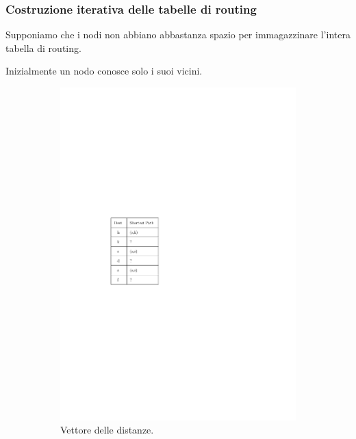 \documentclass[10pt,xcolor=dvipsnames]{beamer}
\begin{document}
\begin{frame}
	\frametitle{Costruzione iterativa delle tabelle di routing}
	Supponiamo che i nodi non abbiano abbastanza spazio per immagazzinare l'intera tabella di routing.
	\vfill
	\pause

	Inizialmente un nodo conosce solo i suoi vicini.

	\begin{figure}[h]
	\centering
		\begin{subfigure}[b]{0.35\textwidth}
			\includegraphics[scale=0.8]{routing_table_local_initial.pdf}
			\caption*{Vettore delle distanze.}
		\end{subfigure}
		\begin{subfigure}[b]{0.6\textwidth}

\end{subfigure}
\end{figure}
\end{frame}
\end{document}
